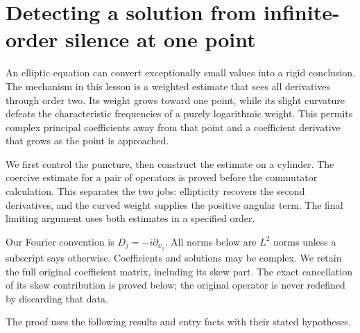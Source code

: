 \documentclass[
  11pt,
]{article}
\author{}
\date{}
\makeatletter
\let\ReaderOriginalAnchorStart\hyper@anchorstart
\let\ReaderOriginalAnchorEnd\hyper@anchorend
\let\ReaderPendingAliases\@empty
\def\ReaderArmAliases#1{\gdef\ReaderPendingAliases{#1}}
\def\hyper@anchorstart#1{\ReaderIfNativeAnchorTF{#1}{\ReaderPendingAliases\global\let\ReaderPendingAliases\@empty}{}\ReaderOriginalAnchorStart{#1}}
\makeatother
\begin{document}
\ReaderArmAliases{\ReaderOriginalAnchorStart{detecting-a-solution-from-infinite-order-silence-at-one-point}\ReaderOriginalAnchorEnd}
\section{Detecting a solution from infinite-order silence at one
point}\label{detecting-a-solution-from-infinite-order-silence-at-one-point}

An elliptic equation can convert exceptionally small values into a rigid
conclusion. The mechanism in this lesson is a weighted estimate that
sees all derivatives through order two. Its weight grows toward one
point, while its slight curvature defeats the characteristic frequencies
of a purely logarithmic weight. This permits complex principal
coefficients away from that point and a coefficient derivative that
grows as the point is approached.

We first control the puncture, then construct the estimate on a
cylinder. The coercive estimate for a pair of operators is proved before
the commutator calculation. This separates the two jobs: ellipticity
recovers the second derivatives, and the curved weight supplies the
positive angular term. The final limiting argument uses both estimates
in a specified order.

Our Fourier convention is \(D_j=-i\partial_{x_j}\). All norms below are
\(L^2\) norms unless a subscript says otherwise. Coefficients and
solutions may be complex. We retain the full original coefficient
matrix, including its skew part. The exact cancellation of its skew
contribution is proved below; the original operator is never redefined
by discarding that data.

The proof uses the following results and entry facts with their stated
hypotheses.
\end{document}
